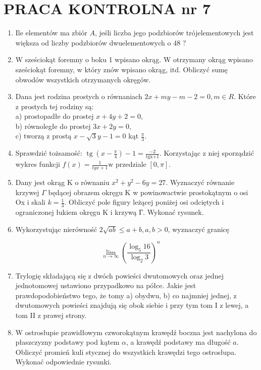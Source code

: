 \documentclass[10pt]{article}
\begin{document}
\section*{PRACA KONTROLNA nr 7}
\begin{enumerate}
  \item Ile elementów ma zbiór $A$, jeśli liczba jego podzbiorów trójelementowych jest większa od liczby podzbiorów dwuelementowych o 48 ?
  \item W sześciokąt foremny o boku 1 wpisano okrąg. W otrzymany okrąg wpisano sześciokąt foremny, w który znów wpisano okrąg, itd. Obliczyć sumę obwodów wszystkich otrzymanych okręgów.
  \item Dana jest rodzina prostych o równaniach $2 x+m y-m-2=0, m \in R$. Które z prostych tej rodziny są:\\
a) prostopadłe do prostej $x+4 y+2=0$,\\
b) równoległe do prostej $3 x+2 y=0$,\\
c) tworzą z prostą $x-\sqrt{3} y-1=0$ kąt $\frac{\pi}{3}$.
  \item Sprawdzić tożsamość: $\operatorname{tg}\left(x-\frac{\pi}{4}\right)-1=\frac{-2}{\operatorname{tgx+1}}$. Korzystając z niej sporządzić wykres funkcji $f(x)=\frac{1}{t g x+1} \mathrm{w}$ przedziale $[0, \pi]$.
  \item Dany jest okrąg K o równaniu $x^{2}+y^{2}-6 y=27$. Wyznaczyć równanie krzywej $\Gamma$ będącej obrazem okręgu K w powinowactwie prostokątnym o osi Ox i skali $k=\frac{1}{3}$. Obliczyć pole figury leżącej poniżej osi odciętych i ograniczonej łukiem okręgu K i krzywą Г. Wykonać rysunek.
  \item Wykorzystując nierówność $2 \sqrt{a b} \leqslant a+b, a, b>0$, wyznaczyć granicę
\end{enumerate}

$$
\lim _{n \rightarrow \infty}\left(\frac{\log _{5} 16}{\log _{2} 3}\right)^{n}
$$

\begin{enumerate}
  \setcounter{enumi}{6}
  \item Trylogię składającą się z dwóch powieści dwutomowych oraz jednej jednotomowej ustawiono przypadkowo na półce. Jakie jest prawdopodobieństwo tego, że tomy a) obydwu, b) co najmniej jednej, z dwutomowych powieści znajdują się obok siebie i przy tym tom I z lewej, a tom II z prawej strony.
  \item W ostrosłupie prawidłowym czworokątnym krawędź boczna jest nachylona do płaszczyzny podstawy pod kątem $\alpha$, a krawędź podstawy ma długość $a$. Obliczyć promień kuli stycznej do wszystkich krawędzi tego ostrosłupa. Wykonać odpowiednie rysunki.
\end{enumerate}
\end{document}
